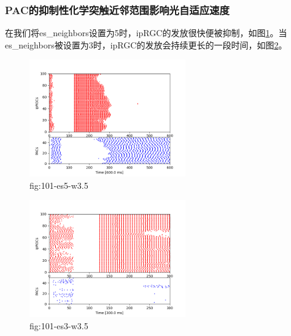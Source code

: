 \documentclass[lang=cn,11pt,a4paper,cite=numbers]{elegantpaper}
\begin{document}
\subsubsection{PAC的抑制性化学突触近邻范围影响光自适应速度}
  在我们将es\_neighbors设置为5时，ipRGC的发放很快便被抑制，如图\ref{fig:101-es5-w3.5}。当es\_neighbors被设置为3时，ipRGC的发放会持续更长的一段时间，如图\ref{fig:101-es3-w3.5}。
\begin{figure}[!htb]
  \centering
  \includegraphics[width=0.6\textwidth]{figs/101-es5-w3.5.png}
  \caption{fig:101-es5-w3.5}
  \label{fig:101-es5-w3.5}
\end{figure}
\begin{figure}[!htb]
  \centering
  \includegraphics[width=0.6\textwidth]{figs/101-es3-w3.5.png}
  \caption{fig:101-es3-w3.5}
  \label{fig:101-es3-w3.5}
\end{figure}
\end{document}
